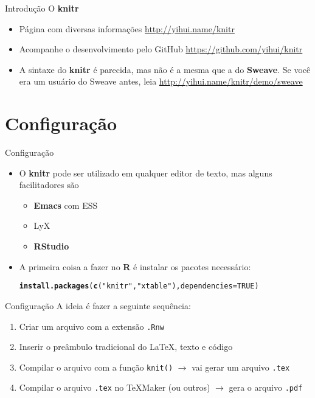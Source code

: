 \documentclass{beamer}\usepackage[]{graphicx}\usepackage[]{color}
\makeatletter
\newcommand{\hlnum}[1]{\textcolor[rgb]{0.686,0.059,0.569}{#1}}%
\newcommand{\hlstr}[1]{\textcolor[rgb]{0.192,0.494,0.8}{#1}}%
\newcommand{\hlstd}[1]{\textcolor[rgb]{0.345,0.345,0.345}{#1}}%
\newcommand{\hlkwc}[1]{\textcolor[rgb]{0.333,0.667,0.333}{#1}}%
\newcommand{\hlkwd}[1]{\textcolor[rgb]{0.737,0.353,0.396}{\textbf{#1}}}%
\newenvironment{kframe}{%
 \def\at@end@of@kframe{}%
 \ifinner\ifhmode%
  \def\at@end@of@kframe{\end{minipage}}%
  \begin{minipage}{\columnwidth}%
 \fi\fi%
 \def\FrameCommand##1{\hskip\@totalleftmargin \hskip-\fboxsep
 \colorbox{shadecolor}{##1}\hskip-\fboxsep
     \hskip-\linewidth \hskip-\@totalleftmargin \hskip\columnwidth}%
 \MakeFramed {\advance\hsize-\width
   \@totalleftmargin\z@ \linewidth\hsize
   \@setminipage}}%
 {\par\unskip\endMakeFramed%
 \at@end@of@kframe}
\newenvironment{knitrout}{}{} %
\providecommand{\R}{\textbf{R}\xspace}
\providecommand{\emacs}{\textbf{Emacs}\xspace}
\providecommand{\knitr}{\textbf{knitr}\xspace}
\providecommand{\rstudio}{\textbf{RStudio}\xspace}
\makeatother
\begin{document}
\begin{frame}{Introdução}
O \textbf{knitr}
\begin{itemize}
\item Página com diversas informações \url{http://yihui.name/knitr}
\item Acompanhe o desenvolvimento pelo GitHub
  \url{https://github.com/yihui/knitr}
\item A sintaxe do \textbf{knitr} é parecida, mas não é a mesma que a do
  \textbf{Sweave}. Se você era um usuário do Sweave antes, leia
  \url{http://yihui.name/knitr/demo/sweave}
\end{itemize}
\end{frame}

\section{Configuração}

\begin{frame}[fragile]{Configuração}
  \begin{itemize}
  \item O \knitr pode ser utilizado em qualquer editor de texto, mas
    alguns facilitadores são
    \begin{itemize}
    \item \emacs com ESS
    \item LyX
    \item \rstudio
    \end{itemize}
  \item A primeira coisa a fazer no \R é instalar os pacotes necessário:
\begin{knitrout}\footnotesize
{}\color{fgcolor}\begin{kframe}
\begin{alltt}
\hlkwd{install.packages}\hlstd{(}\hlkwd{c}\hlstd{(}\hlstr{"knitr"}\hlstd{,} \hlstr{"xtable"}\hlstd{),} \hlkwc{dependencies} \hlstd{=} \hlnum{TRUE}\hlstd{)}
\end{alltt}
\end{kframe}
\end{knitrout}

  \end{itemize}
\end{frame}

\begin{frame}[fragile]{Configuração}
A ideia é fazer a seguinte sequência:
\begin{enumerate}
\item Criar um arquivo com a extensão \texttt{.Rnw}
\item Inserir o preâmbulo tradicional do \LaTeX{}, texto e código
\item Compilar o arquivo com a função \texttt{knit()} $\rightarrow$ vai
  gerar um arquivo \texttt{.tex}
\item Compilar o arquivo \texttt{.tex} no \TeX{}Maker (ou outros)
  $\rightarrow$ gera o arquivo \texttt{.pdf}
\end{enumerate}
\end{frame}
\end{document}
